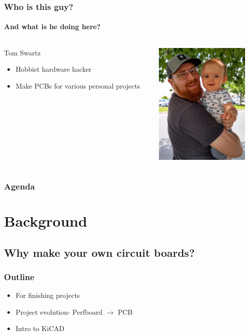 \documentclass[]{beamer}
\begin{document}
\begin{frame}[plain]
    \frametitle{Who is this guy?}
    \framesubtitle{And what is he doing here?}
    \begin{columns}[T]
        \begin{column}[T]{5cm}
           {\huge Tom Swartz}
            \begin{itemize}%
                \item{Hobbist hardware hacker}
                \item{Make PCBs for various personal projects}
            \end{itemize}
        \end{column}
        \begin{column}[T]{5cm}
            \includegraphics[height=6cm]{images/me.jpg}
        \end{column}
    \end{columns}
\end{frame}

\begin{frame}[plain]
    \frametitle{Agenda}
    \tableofcontents
\end{frame}

\section[Background]{Background}
\subsection[But Why?]{Why make your own circuit boards?}
\begin{frame}
    \frametitle{\insertsection{} Outline}
    \begin{itemize}
        \item For finishing projects
        \item Project evolution- Perfboard $\rightarrow{}$ PCB
        \item Intro to KiCAD
    \end{itemize}
\end{frame}
\end{document}
